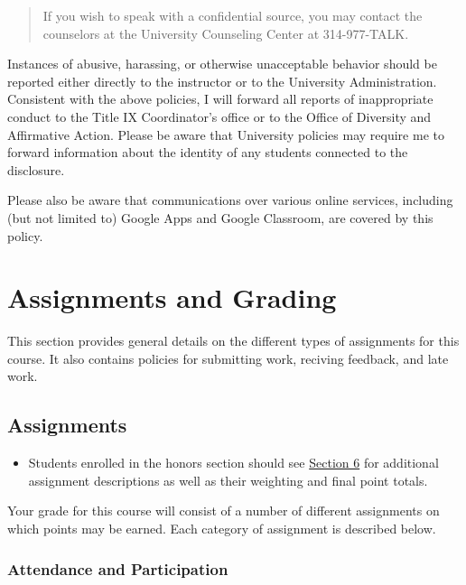 \documentclass[]{book}
\newenvironment{rmdblock}[1]
  {\begin{shaded*}
  \begin{itemize}
  \renewcommand{\labelitemi}{
    \raisebox{-.7\height}[0pt][0pt]{
      {\setkeys{Gin}{width=3em,keepaspectratio}\texttt{[image: images/\#1]}}
    }
  }
  \item
  }
  {
  \end{itemize}
  \end{shaded*}
  }
\newenvironment{rmdwarning}
  {\begin{rmdblock}{warning}}
  {\end{rmdblock}}
\theoremstyle{definition}
\theoremstyle{definition}
\theoremstyle{definition}
\theoremstyle{remark}
\begin{document}
\begin{quote}
If you wish to speak with a confidential source, you may contact the
counselors at the University Counseling Center at 314-977-TALK.
\end{quote}

Instances of abusive, harassing, or otherwise unacceptable behavior
should be reported either directly to the instructor or to the
University Administration. Consistent with the above policies, I will
forward all reports of inappropriate conduct to the Title IX
Coordinator's office or to the Office of Diversity and Affirmative
Action. Please be aware that University policies may require me to
forward information about the identity of any students connected to the
disclosure.

Please also be aware that communications over various online services,
including (but not limited to) Google Apps and Google Classroom, are
covered by this policy.

\hypertarget{assignments-and-grading}{%
\chapter{Assignments and Grading}\label{assignments-and-grading}}

This section provides general details on the different types of
assignments for this course. It also contains policies for submitting
work, reciving feedback, and late work.

\hypertarget{assignments}{%
\section{Assignments}\label{assignments}}

\begin{rmdwarning}
Students enrolled in the honors section should see
\href{/honors-overview.html}{Section 6} for additional assignment
descriptions as well as their weighting and final point totals.
\end{rmdwarning}

Your grade for this course will consist of a number of different
assignments on which points may be earned. Each category of assignment
is described below.

\hypertarget{attendance-and-participation-1}{%
\subsection{Attendance and
Participation}\label{attendance-and-participation-1}}
\end{document}
